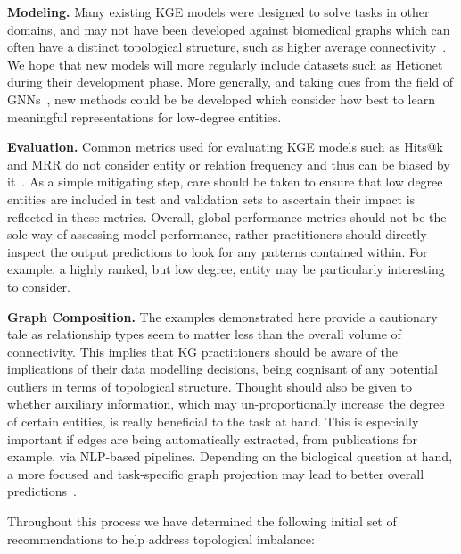 \textbf{Modeling.} Many existing KGE models were designed to solve tasks in other domains, and may not have been developed against biomedical graphs which can often have a distinct topological structure, such as higher average connectivity~\cite{liu2021neural}. We hope that new models will more regularly include datasets such as Hetionet during their development phase. More generally, and taking cues from the field of GNNs~\cite{liu2021tail, liu2020towards, tang2020investigating}, new methods could be be developed which consider how best to learn meaningful representations for low-degree entities.

\textbf{Evaluation.} Common metrics used for evaluating KGE models such as Hits@k and MRR do not consider entity or relation frequency and thus can be biased by it~\cite{mohamed2020popularity}. As a simple mitigating step, care should be taken to ensure that low degree entities are included in test and validation sets to ascertain their impact is reflected in these metrics. Overall,  global performance metrics should not be the sole way of assessing model performance, rather practitioners should directly inspect the output predictions to look for any patterns contained within. For example, a highly ranked, but low degree, entity may be particularly interesting to consider.

\textbf{Graph Composition.} The examples demonstrated here provide a cautionary tale as relationship types seem to matter less than the overall volume of connectivity. This implies that KG practitioners should be aware of the implications of their data modelling decisions, being cognisant of any potential outliers in terms of topological structure. Thought should also be given to whether auxiliary information, which may un-proportionally increase the degree of certain entities, is really beneficial to the task at hand. This is especially important if edges are being automatically extracted, from publications for example, via NLP-based pipelines. Depending on the biological question at hand, a more focused and task-specific graph projection may lead to better overall predictions~\cite{ratajczak2021task}.

Throughout this process we have determined the following initial set of recommendations to help address topological imbalance:

